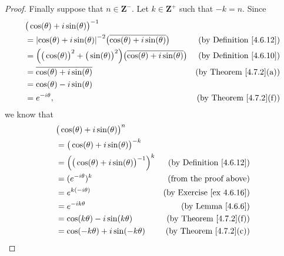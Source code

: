 \begin{proof}
    Finally suppose that \(n \in \mathbf{Z}^-\).
    Let \(k \in \mathbf{Z}^+\) such that \(-k = n\).
    Since
    \begin{align*}
         & \big(\cos(\theta) + i \sin(\theta)\big)^{-1}                                                                                                             \\
         & = \abs*{\cos(\theta) + i \sin(\theta)}^{-2} \big(\overline{\cos(\theta) + i \sin(\theta)}\big)                     & \text{(by Definition \ref{4.6.12})} \\
         & = \Big(\big(\cos(\theta)\big)^2 + \big(\sin(\theta)\big)^2\Big) \big(\overline{\cos(\theta) + i \sin(\theta)}\big) & \text{(by Definition \ref{4.6.10})} \\
         & = \overline{\cos(\theta) + i \sin(\theta)}                                                                         & \text{(by Theorem \ref{4.7.2}(a))}  \\
         & = \cos(\theta) - i \sin(\theta)                                                                                                                          \\
         & = e^{- i \theta},                                                                                                  & \text{(by Theorem \ref{4.7.2}(f))}
    \end{align*}
    we know that
    \begin{align*}
         & \big(\cos(\theta) + i \sin(\theta)\big)^n                                                         \\
         & = \big(\cos(\theta) + i \sin(\theta)\big)^{-k}                                                    \\
         & = \Big(\big(\cos(\theta) + i \sin(\theta)\big)^{-1}\Big)^k & \text{(by Definition \ref{4.6.12})}  \\
         & = (e^{- i \theta})^k                                       & \text{(from the proof above)}        \\
         & = e^{k (- i \theta)}                                       & \text{(by Exercise \ref{ex 4.6.16})} \\
         & = e^{- i k \theta}                                         & \text{(by Lemma \ref{4.6.6})}        \\
         & = \cos(k \theta) - i \sin(k \theta)                        & \text{(by Theorem \ref{4.7.2}(f))}   \\
         & = \cos(- k \theta) + i \sin(- k \theta)                    & \text{(by Theorem \ref{4.7.2}(c))}   \\

\end{align*}
\end{proof}

